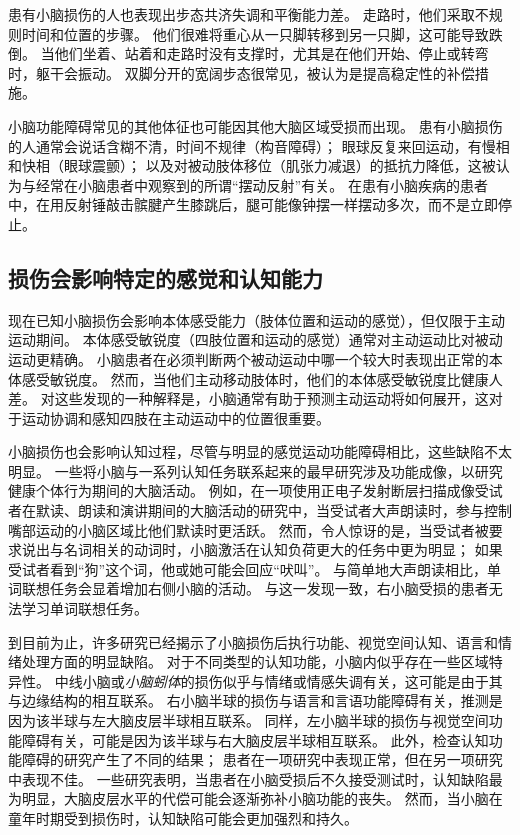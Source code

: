 患有小脑损伤的人也表现出步态共济失调和平衡能力差。 走路时，他们采取不规则时间和位置的步骤。
他们很难将重心从一只脚转移到另一只脚，这可能导致跌倒。
当他们坐着、站着和走路时没有支撑时，尤其是在他们开始、停止或转弯时，躯干会振动。
双脚分开的宽阔步态很常见，被认为是提高稳定性的补偿措施。


小脑功能障碍常见的其他体征也可能因其他大脑区域受损而出现。
患有小脑损伤的人通常会说话含糊不清，时间不规律（构音障碍）；
眼球反复来回运动，有慢相和快相（眼球震颤）；
以及对被动肢体移位（肌张力减退）的抵抗力降低，这被认为与经常在小脑患者中观察到的所谓“摆动反射”有关。
在患有小脑疾病的患者中，在用反射锤敲击髌腱产生膝跳后，腿可能像钟摆一样摆动多次，而不是立即停止。



\subsection{损伤会影响特定的感觉和认知能力}

现在已知小脑损伤会影响本体感受能力（肢体位置和运动的感觉），但仅限于主动运动期间。
本体感受敏锐度（四肢位置和运动的感觉）通常对主动运动比对被动运动更精确。
小脑患者在必须判断两个被动运动中哪一个较大时表现出正常的本体感受敏锐度。
然而，当他们主动移动肢体时，他们的本体感受敏锐度比健康人差。
对这些发现的一种解释是，小脑通常有助于预测主动运动将如何展开，这对于运动协调和感知四肢在主动运动中的位置很重要。


小脑损伤也会影响认知过程，尽管与明显的感觉运动功能障碍相比，这些缺陷不太明显。
一些将小脑与一系列认知任务联系起来的最早研究涉及功能成像，以研究健康个体行为期间的大脑活动。
例如，在一项使用正电子发射断层扫描成像受试者在默读、朗读和演讲期间的大脑活动的研究中，当受试者大声朗读时，参与控制嘴部运动的小脑区域比他们默读时更活跃。
然而，令人惊讶的是，当受试者被要求说出与名词相关的动词时，小脑激活在认知负荷更大的任务中更为明显；
如果受试者看到“狗”这个词，他或她可能会回应“吠叫”。
与简单地大声朗读相比，单词联想任务会显着增加右侧小脑的活动。
与这一发现一致，右小脑受损的患者无法学习单词联想任务。


到目前为止，许多研究已经揭示了小脑损伤后执行功能、视觉空间认知、语言和情绪处理方面的明显缺陷。
对于不同类型的认知功能，小脑内似乎存在一些区域特异性。
中线小脑或\textit{小脑蚓体}的损伤似乎与情绪或情感失调有关，这可能是由于其与边缘结构的相互联系。
右小脑半球的损伤与语言和言语功能障碍有关，推测是因为该半球与左大脑皮层半球相互联系。
同样，左小脑半球的损伤与视觉空间功能障碍有关，可能是因为该半球与右大脑皮层半球相互联系。
此外，检查认知功能障碍的研究产生了不同的结果；
患者在一项研究中表现正常，但在另一项研究中表现不佳。
一些研究表明，当患者在小脑受损后不久接受测试时，认知缺陷最为明显，大脑皮层水平的代偿可能会逐渐弥补小脑功能的丧失。
然而，当小脑在童年时期受到损伤时，认知缺陷可能会更加强烈和持久。


